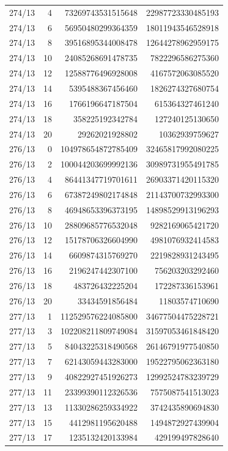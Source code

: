 \begin{longtable}{@{}rrrr@{}}
274/13 & 4 & 73269743531515648 & 22987723330485193\\
274/13 & 6 & 56950480299364359 & 18011943546528918\\
274/13 & 8 & 39516895344008478 & 12644278962959175\\
274/13 & 10 & 24085268691478735 & 7822296586275360\\
274/13 & 12 & 12588776496928008 & 4167572063085520\\
274/13 & 14 & 5395488367456460 & 1826274327680754\\
274/13 & 16 & 1766196647187504 & 615364327461240\\
274/13 & 18 & 358225192342784 & 127240125130650\\
274/13 & 20 & 29262021928802 & 10362939759627\\
276/13 & 0 & 104978654872785409 & 32465817992080225\\
276/13 & 2 & 100044203699992136 & 30989731955491785\\
276/13 & 4 & 86441347719701611 & 26903371420115320\\
276/13 & 6 & 67387249802174848 & 21143700732993300\\
276/13 & 8 & 46948653396373195 & 14898529913196293\\
276/13 & 10 & 28809685776532048 & 9282169065421720\\
276/13 & 12 & 15178706326604990 & 4981076932414583\\
276/13 & 14 & 6609874315769270 & 2219828931243495\\
276/13 & 16 & 2196247442307100 & 756203203292460\\
276/13 & 18 & 483726432225204 & 172287336153961\\
276/13 & 20 & 33434591856484 & 11803574710690\\
277/13 & 1 & 112529576224085800 & 34677504475228721\\
277/13 & 3 & 102208211809749084 & 31597053461848420\\
277/13 & 5 & 84043225318490568 & 26146791977540850\\
277/13 & 7 & 62143059443283000 & 19522795062363180\\
277/13 & 9 & 40822927451926273 & 12992524783239729\\
277/13 & 11 & 23399390112326536 & 7575087541513023\\
277/13 & 13 & 11330286259334922 & 3742435890694830\\
277/13 & 15 & 4412981195620488 & 1494872927439904\\
277/13 & 17 & 1235132420133984 & 429199497828640\\

\end{longtable}
